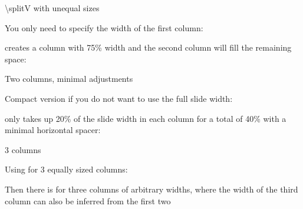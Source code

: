 \documentclass[11pt,compress,t,notes=noshow, xcolor=table]{beamer}
\begin{document}

\begin{frame}{\textbackslash splitV with unequal sizes}
  
  You only need to specify the width of the first column:
  
  \vfill
  
   creates a column with 75\% width and the
  second column will fill the remaining space:
  
  \vfill
  
  
  \vfill
  
  
\end{frame}


\begin{frame}{Two columns, minimal adjustments}
  
  Compact version if you do not want to use the full slide width:
  
   only takes up 20\% of the slide width in each column for a total of 40\% with a minimal horizontal spacer:
  
  \vfill
  
  
  
\end{frame}


\begin{frame}{3 columns}
  
  Using  for 3 equally sized columns:
  
  \vfill
  
  
  \vfill
  
  Then there is  for three columns of
  arbitrary widths, where the width of the third column can also be inferred from the first two
  \vfill
  
  
\end{frame}
\end{document}
